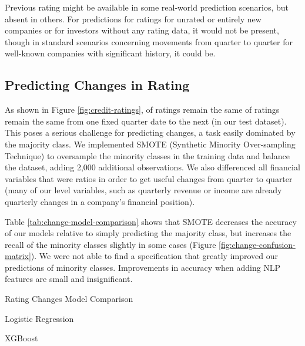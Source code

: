 \documentclass{article}[11pt]
\begin{document}
    Previous rating might be available in some real-world prediction scenarios, but absent in others. For predictions for ratings for unrated or entirely new companies or for investors without any rating data, it would not be present, though in standard scenarios concerning movements from quarter to quarter for well-known companies with significant history, it could be.

    \clearpage
    \newpage

    \subsection{Predicting Changes in Rating}

    \label{sec:change-prediction}

    As shown in Figure \ref{fig:credit-ratings}, \shareNotChanges \space of ratings remain the same of ratings remain the same from one fixed quarter date to the next (\shareNotChangesTest \space in our test dataset). This poses a serious challenge for predicting changes, a task easily dominated by the majority class. We implemented SMOTE (Synthetic Minority Over-sampling Technique) \citep{chawla_smote_2002} to oversample the minority classes in the training data and balance the dataset, adding 2,000 additional observations. We also differenced all financial variables that were ratios in order to get useful changes from quarter to quarter (many of our level variables, such as quarterly revenue or income are already quarterly changes in a company's financial position).

    Table \ref{tab:change-model-comparison} shows that SMOTE decreases the accuracy of our models relative to simply predicting the majority class, but increases the recall of the minority classes slightly in some cases (Figure \ref{fig:change-confusion-matrix}). We were not able to find a specification that greatly improved our predictions of minority classes. Improvements in accuracy when adding NLP features are small and insignificant.

    \begin{table}[h!]
        \centering
        \caption{Rating Changes Model Comparison}
        \begin{minipage}[c]{0.45\linewidth}
            \centering
            
            \caption*{\footnotesize Logistic Regression} 
        \end{minipage}
        \begin{minipage}[c]{0.45\linewidth}
            \centering
            
            \caption*{\footnotesize XGBoost} 
        \end{minipage}
        \label{tab:change-model-comparison}
    \end{table}
\end{document}
